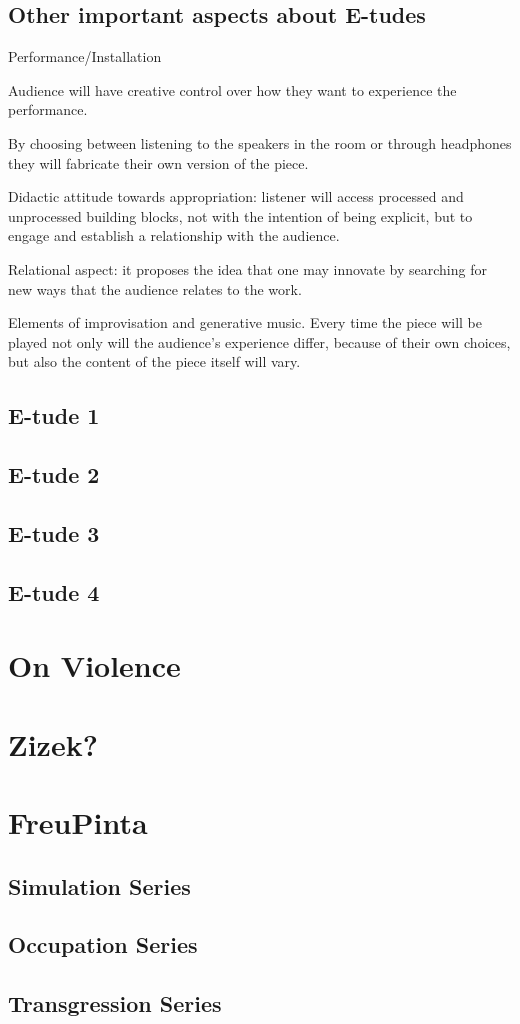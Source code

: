 \subsection{Other important aspects about E-tudes}

Performance/Installation 

Audience will have creative control over how they want to experience the performance.

By choosing between listening to the speakers in the room or through headphones they will fabricate their own version of the piece.

Didactic attitude towards appropriation: listener will access processed and unprocessed building blocks, not with the intention of being explicit, but to engage and establish a relationship with the audience.

Relational aspect: it proposes the idea that one may innovate by searching for new ways that the audience relates to the work.

Elements of improvisation and generative music. Every time the piece will be played not only will the audience’s experience differ, because of their own choices, but also the content of the piece itself will vary.

	
\subsection{E-tude 1}
\subsection{E-tude 2}
\subsection{E-tude 3}
\subsection{E-tude 4}

\section{On Violence}

\section{Zizek?}

\section{FreuPinta}

\subsection{Simulation Series}
\subsection{Occupation Series}
\subsection{Transgression Series}

\label{ch:compositions}
